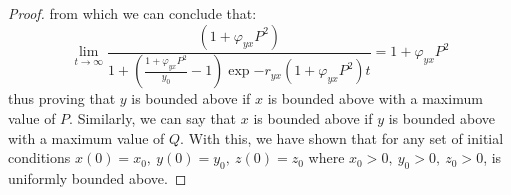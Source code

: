 \begin{proof}
    from which we can conclude that:
    \begin{equation*}
        \lim_{t\to\infty} \frac{\left(1+\varphi_{yx}P^2\right)}{1+\left(\frac{1+\varphi_{yx}P^2}{y_0}-1\right)\exp{-r_{yx}\left(1+\varphi_{yx}P^2\right)t}} = 1+\varphi_{yx}P^2
    \end{equation*}
    thus proving that $y$ is bounded above if $x$ is bounded above with a maximum value of $P$.
    Similarly, we can say that $x$ is bounded above if $y$ is bounded above with a maximum value of $Q$. 
    With this, we have shown that for any set of initial conditions $x(0) = x_0,\ y(0) = y_0,\ z(0) = z_0$ where $x_0 > 0,\ y_0 > 0,\ z_0 > 0$,  is uniformly bounded above.
\end{proof}
